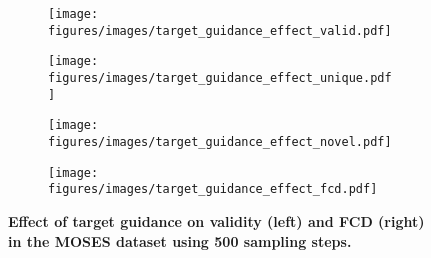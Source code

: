 \begin{figure}[h!]
    \centering
    \setlength{\abovecaptionskip}{0pt} 
    \setlength{\belowcaptionskip}{0pt}  
    
    \begin{subfigure}[b]{0.49\textwidth} 
        \centering
        \texttt{[image: figures/images/target\_guidance\_effect\_valid.pdf]}
        \label{fig:target_guidance_effect_valid}
    \end{subfigure}
    \hfill 
    \begin{subfigure}[b]{0.49\textwidth} 
        \centering
        \texttt{[image: figures/images/target\_guidance\_effect\_unique.pdf]}
        \label{fig:target_guidance_effect_unique}
    \end{subfigure}
    \hfill 
    \begin{subfigure}[b]{0.49\textwidth} 
        \centering
        \texttt{[image: figures/images/target\_guidance\_effect\_novel.pdf]}
        \label{fig:target_guidance_effect_novel}
    \end{subfigure}
    \hfill 
    \begin{subfigure}[b]{0.49\textwidth} 
        \centering
        \texttt{[image: figures/images/target\_guidance\_effect\_fcd.pdf]}
        \label{fig:target_guidance_effect_fcd}
    \end{subfigure}
    
    \caption{\textbf{Effect of target guidance on validity (left) and FCD (right) in the MOSES dataset using 500 sampling steps.}}
    \label{fig:target_guidance_effect}
\end{figure}